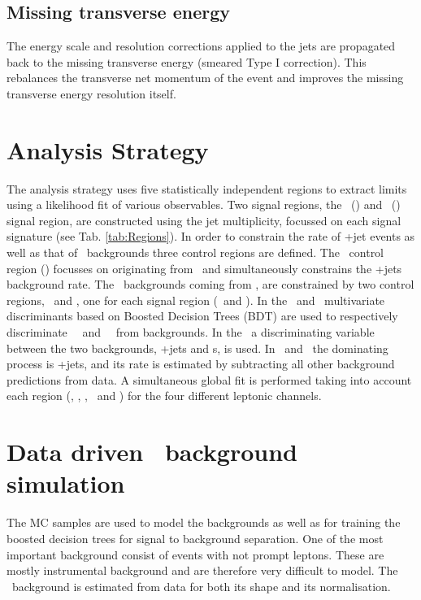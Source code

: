 \subsection*{Missing transverse energy}
The energy scale and resolution corrections applied to the jets are propagated back to the  missing transverse energy (smeared Type I correction). This rebalances the transverse net momentum of the event and improves the missing transverse energy resolution itself.

\section{Analysis Strategy}
\label{sec:selection}

The analysis strategy uses five statistically independent regions to extract limits using a likelihood fit of various observables. Two signal regions, the \tZ\ (\STSR) and \tZq\ (\TTSR) signal region, are constructed using the jet multiplicity,  focussed on each signal signature (see Tab. \ref{tab:Regions}).  In order to constrain the rate of \WZ+jet events as well as that of \NPL\ backgrounds three control regions are defined. The \WZ\ control region (\WZCR) focusses on \NPL\s originating from \DY\ and simultaneously constrains the \WZ+jets background rate. The \NPL\ backgrounds coming from \ttbar, are constrained by two control regions, \TTCR\ and \STCR, one for each signal region (\TTSR\ and \STSR).  In the \STSR\ and \TTSR\, multivariate discriminants based on Boosted Decision Trees (BDT) are used to respectively discriminate \FCNC\ \tZ\ and \FCNC\ \tZq\ from backgrounds. In the \WZCR\ a  discriminating variable between the two backgrounds, \WZ+jets and \NPL s, is used. In \TTCR\ and \STCR\, the dominating process is \ttbar+jets, and its rate is estimated by subtracting all other background predictions from data. A simultaneous global fit is performed taking into account each region (\STSR, \TTSR, \WZCR, \TTCR\ and \STCR) for the four different leptonic channels. 

\section{Data driven \NPL\ background simulation}
\label{sec:NPL}

The MC samples are used to model the backgrounds as well as for training the boosted decision trees
for signal to background separation. One of the most important background consist of events with not prompt leptons. These are mostly instrumental background and are therefore very difficult to model. The \NPL\ background is estimated from data for both its shape and its normalisation. 


